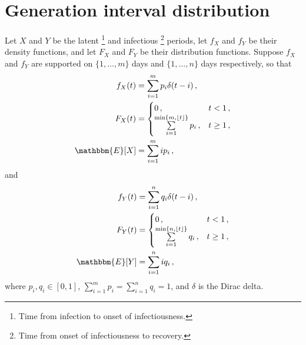 \documentclass[12pt]{article}
\begin{document}
\setlength{\parskip}{3mm}
\setlength{\parindent}{7mm}

\section{Generation interval distribution}

Let $X$ and $Y$ be the latent%
\footnote{Time from infection to onset of infectiousness.}
and infectious%
\footnote{Time from onset of infectiousness to recovery.}
periods, let $f_X$ and $f_Y$ be their density functions,
and let $F_X$ and $F_Y$ be their distribution functions.
Suppose $f_X$ and $f_Y$ are supported on $\{1,\ldots,m\}$
days and $\{1,\ldots,n\}$ days respectively, so that
%
\begin{subequations}
  \begin{align}
    f_X(t) &= \sum_{i=1}^{m} p_i \delta(t - i)\,, \label{eq:fX} \\
    F_X(t) &= \begin{cases} 0\,, & t < 1\,, \\ \sum\limits_{i=1}^{\min\{m,\lfloor t \rfloor\}} p_i\,, & t \geq 1\,, \end{cases} \\ 
    \mathbbm{E}[X] &= \sum_{i=1}^{m} i p_i\,,
  \end{align}
\end{subequations}
%
and
%
\begin{subequations}
  \begin{align}
    f_Y(t) &= \sum_{i=1}^{n} q_i \delta(t - i)\,, \\
    F_Y(t) &= \begin{cases} 0\,, & t < 1\,, \\ \sum\limits_{i=1}^{\min\{n,\lfloor t \rfloor\}} q_i\,, & t \geq 1\,, \end{cases} \label{eq:FY} \\
    \mathbbm{E}[Y] &= \sum_{i=1}^{n} i q_i\,,
  \end{align}
\end{subequations}
%
where $p_i,q_i \in [0,1]$, $\sum_{i=1}^{m} p_i = \sum_{i=1}^{n} q_i = 1$,
and $\delta$ is the Dirac delta.
\end{document}
